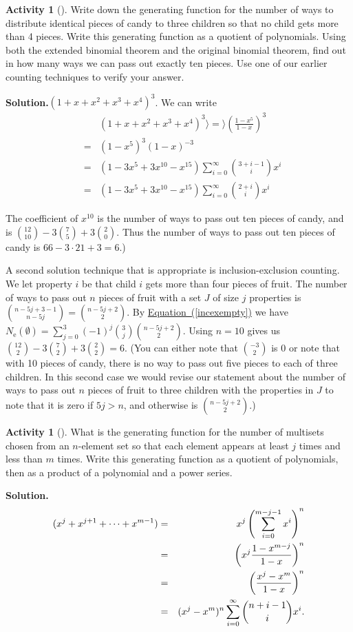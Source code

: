 \documentclass[10pt,]{book}
\theoremstyle{plain}
\theoremstyle{definition}
\newtheorem{activity}[project]{Activity}
\numberwithin{equation}{chapter}
\newcommand{\amp}{&}
\begin{document}
\begin{activity}[]\label{activity-171}
Write down the generating function for the number of ways to distribute identical pieces of candy to three children so that no child gets more than 4 pieces. Write this generating function as a quotient of polynomials. Using both the extended binomial theorem and the original binomial theorem, find out in how many ways we can pass out exactly ten pieces. Use one of our earlier counting techniques to verify your answer.%
\par\medskip\noindent%
\textbf{Solution.}\quad \((1+x+x^2+x^3+x^4)^3\). We can write%
\begin{align*}
\amp \amp (1+x+x^2+x^3+x^4)^3 \rangle =\rangle \left(\frac{1-x^5}{1-x}\right)^3\\
\amp =\amp (1-x^5)^3(1-x)^{-3}\\
\amp =\amp (1-3x^5+3x^{10}-x^{15})\sum_{i=0}^\infty \binom{3+i-1}{i}x^i\\
\amp =\amp (1-3x^5+3x^{10}-x^{15})\sum_{i=0}^\infty \binom{2+i}{i}x^i
\end{align*}
%
\par
The coefficient of \(x^{10}\) is the number of ways to pass out ten pieces of candy, and is \(\binom{12}{10}-3\binom{7}{5} +3\binom{2}{0}\).  Thus the number of ways to pass out ten pieces of candy is \(66-3\cdot21+3=6\).)%
\par
A second solution technique that is appropriate is inclusion-exclusion counting. We let property \(i\) be that child \(i\) gets more than four pieces of fruit. The number of ways to pass out \(n\) pieces of fruit with a set \(J\) of size \(j\) properties is \(\binom{n-5j+3-1}{n-5j}=\binom{n-5j+2}{2}\). By \hyperref[incexempty]{Equation~(\ref{incexempty})} we have \(N_{\mbox{e} }(\emptyset) = \sum_{j=0}^3 (-1)^j\binom{3}{j}\binom{n-5j+2}{2}\). Using \(n=10\) gives us \(\binom{12}{2}-3\binom{7}{2} +3\binom{2}{2} =6.\) (You can either note that \(\binom{-3}{2}\) is 0 or note that with 10 pieces of candy, there is no way to pass out five pieces to each of three children. In this second case we would revise our statement about the number of ways to pass out \(n\) pieces of fruit to three children with the properties in \(J\) to note that it is zero if \(5j>n\), and otherwise is \(\binom{n-5j+2}{2}\).)%
\end{activity}
\begin{activity}[]\label{activity-172}
What is the generating function for the number of multisets chosen from an \(n\)-element set so that each element appears at least \(j\) times and less than \(m\) times. Write this generating function as a quotient of polynomials, then as a product of a polynomial and a power series.%
\par\medskip\noindent%
\textbf{Solution.}\quad %
\begin{align*}
(x^j+x^{j+1}+\cdots+x^{m-1})\amp =\amp x^j
\left(\sum_{i=0}^{m-j-1}x^i\right)^n\\
\amp =\amp
\left(x^j{1-x^{m-j}\over 1-x}\right)^n\\
\amp =\amp \left(\frac{x^j-x^m}{1-x}\right)^n\\
\amp =\amp  (x^j-x^m)^n\sum_{i=0}^\infty \binom{n+i-1}{i}x^i.
\end{align*}
%
\end{activity}
\end{document}
